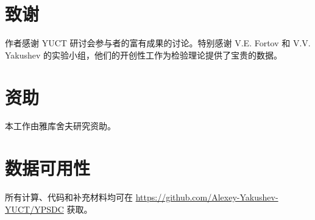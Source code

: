 \documentclass[12pt,a4paper]{article}
\theoremstyle{remark}
\begin{document}
	
	\section*{致谢}
	
	作者感谢 YUCT 研讨会参与者的富有成果的讨论。特别感谢 V.E. Fortov 和 V.V. Yakushev 的实验小组，他们的开创性工作为检验理论提供了宝贵的数据。
	
	\section*{资助}
	
	本工作由雅库舍夫研究资助。
	
	\section*{数据可用性}
	
	所有计算、代码和补充材料均可在 \url{https://github.com/Alexey-Yakushev-YUCT/YPSDC} 获取。
	
\end{document}
